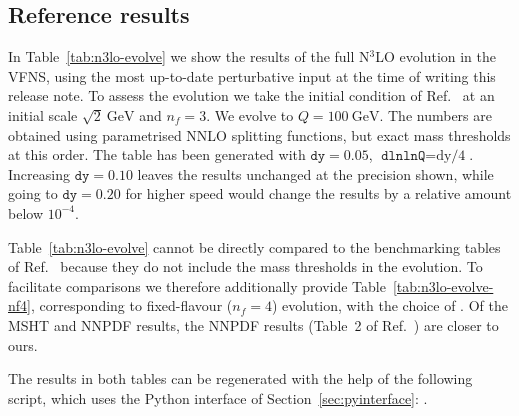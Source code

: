 %   
% 

\subsection{Reference results}

In Table~\ref{tab:n3lo-evolve} we show the results of the full N$^3$LO
evolution in the VFNS, using the most up-to-date perturbative input at
the time of writing this release note. To assess the evolution we take
the initial condition of Ref.~\cite{Dittmar:2005ed} at an initial
scale $\sqrt{2}~\text{GeV}$ and $n_f=3$. We evolve to
$Q=100~\text{GeV}$. The numbers are obtained using parametrised NNLO
splitting functions, but exact mass thresholds at this order.
%
The table has been generated with $\texttt{dy}=0.05$,
$\texttt{dlnlnQ}=\text{dy/4}$.
%
Increasing $\texttt{dy}=0.10$ leaves the results unchanged at the
precision shown, while going to $\texttt{dy}=0.20$ for higher speed
would change the results by a relative amount below $10^{-4}$.

Table~\ref{tab:n3lo-evolve} cannot be directly compared to the
benchmarking tables of Ref.~\cite{Cooper-Sarkar:2024crx} because they
do not include the mass thresholds in the \ntlo evolution.
%
To facilitate comparisons we therefore additionally provide
Table~\ref{tab:n3lo-evolve-nf4}, corresponding to fixed-flavour ($n_f=4$)
evolution, with the choice of
.
%
Of the MSHT and NNPDF results, the NNPDF results (Table~2 of
Ref.~\cite{Cooper-Sarkar:2024crx}) are closer to ours.

The results in both tables can be regenerated with the help
of the following script, which uses the Python interface of
Section~\ref{sec:pyinterface}:
.

